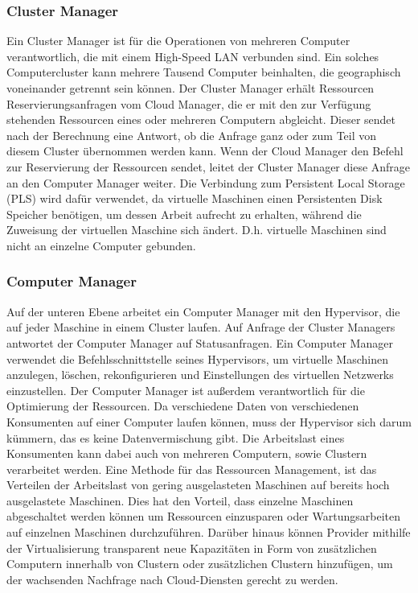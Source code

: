 \subsubsection{Cluster Manager}
Ein Cluster Manager ist für die Operationen von mehreren Computer verantwortlich, die mit einem High-Speed LAN verbunden sind. Ein solches Computercluster kann mehrere Tausend Computer beinhalten, die geographisch voneinander getrennt sein können.
Der Cluster Manager erhält Ressourcen Reservierungsanfragen vom Cloud Manager, die er mit den zur Verfügung stehenden Ressourcen eines oder mehreren Computern abgleicht. Dieser sendet nach der 
Berechnung eine Antwort, ob die Anfrage ganz oder zum Teil von diesem Cluster übernommen werden kann. Wenn der Cloud Manager den Befehl zur Reservierung der Ressourcen sendet, leitet der Cluster Manager diese Anfrage an den Computer Manager weiter. 
Die Verbindung zum Persistent Local Storage (PLS) wird dafür verwendet, da virtuelle Maschinen einen Persistenten Disk Speicher benötigen, um dessen Arbeit aufrecht zu erhalten, während die Zuweisung der virtuellen Maschine sich ändert.
D.h. virtuelle Maschinen sind nicht an einzelne Computer gebunden\cite{Badger}.

\subsubsection{Computer Manager}
Auf der unteren Ebene arbeitet ein Computer Manager mit den Hypervisor, die auf jeder Maschine in einem Cluster laufen.
Auf Anfrage der Cluster Managers antwortet der Computer Manager auf Statusanfragen. Ein Computer Manager verwendet die Befehlsschnittstelle seines Hypervisors, um virtuelle Maschinen anzulegen, löschen, rekonfigurieren und Einstellungen des virtuellen Netzwerks einzustellen.
Der Computer Manager ist außerdem verantwortlich für die Optimierung der Ressourcen. Da verschiedene Daten von verschiedenen Konsumenten auf einer Computer laufen können, muss der Hypervisor sich darum kümmern, das es keine Datenvermischung gibt.
Die Arbeitslast eines Konsumenten kann dabei auch von mehreren Computern, sowie Clustern verarbeitet werden. 
Eine Methode für das Ressourcen Management, ist das Verteilen der Arbeitslast von gering ausgelasteten Maschinen auf bereits hoch ausgelastete Maschinen. Dies hat den Vorteil, dass einzelne Maschinen abgeschaltet werden können um Ressourcen einzusparen oder Wartungsarbeiten auf einzelnen Maschinen durchzuführen.
Darüber hinaus können Provider mithilfe der Virtualisierung transparent neue Kapazitäten in Form von zusätzlichen Computern innerhalb von Clustern oder zusätzlichen Clustern hinzufügen, um der wachsenden Nachfrage nach Cloud-Diensten gerecht zu werden\cite{Badger}.
